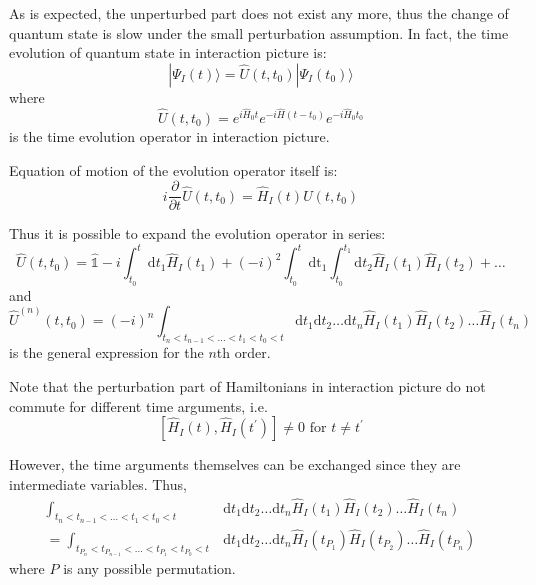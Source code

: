 As is expected, the unperturbed part does not exist any more, thus the change of quantum state is slow under the small perturbation assumption.
In fact, the time evolution of quantum state in interaction picture is:
\begin{equation}
| \Psi_{I}(t) \rangle=\hat{U}\left(t, t_{0}\right) | \Psi_{I}\left(t_{0}\right) \rangle
\end{equation}
where
\begin{equation}
\hat{U}\left(t, t_{0}\right)=e^{i \hat{H}_{0} t} e^{-i \hat{H}\left(t-t_{0}\right)} e^{-i \hat{H}_{0} t_{0}}
\end{equation}
is the time evolution operator in interaction picture.

Equation of motion of the evolution operator itself is:
\begin{equation}
i \frac{\partial}{\partial t} \hat{U}\left(t, t_{0}\right)=\hat{H}_{I}(t) U\left(t, t_{0}\right)
\end{equation}

Thus it is possible to expand the evolution operator in series:
\begin{equation}
\hat{U}\left(t, t_{0}\right)=\hat{\mathbb{1}}-i \int_{t_{0}}^{t} \mathrm{d} t_{1} \hat{H}_{I}\left(t_{1}\right)+(-i)^{2} \int_{t_{0}}^{t} \mathrm{dt}_{1} \int_{t_{0}}^{t_{1}} \mathrm{d} t_{2} \hat{H}_{I}\left(t_{1}\right) \hat{H}_{I}\left(t_{2}\right)+\ldots
\end{equation}
and
\begin{equation}
\hat{U}^{(n)}\left(t, t_{0}\right)=
(-i)^{n} \int_{t_n<t_{n-1}<\dots<t_1<t_0<t} \mathrm{d} t_{1} \mathrm{d} t_{2} \ldots \mathrm{d} t_{n} \hat{H}_{I}\left(t_{1}\right) \hat{H}_{I}\left(t_{2}\right) \ldots \hat{H}_{I}\left(t_{n}\right)
\end{equation}
is the general expression for the $n$th order.

Note that the perturbation part of Hamiltonians in interaction picture do not commute for different time arguments, i.e.
\begin{equation}
\left[\hat{H}_{I}(t), \hat{H}_{I}\left(t^{\prime}\right)\right] \neq 0 \text { for } t \neq t^{\prime}
\end{equation}

However, the time arguments themselves can be exchanged since they are intermediate variables.
Thus,
\begin{equation}
\begin{aligned}
	\int_{t_n<t_{n-1}<\dots<t_1<t_0<t} &\mathrm{d} t_{1} \mathrm{d} t_{2} \ldots \mathrm{d} t_{n} \hat{H}_{I}\left(t_{1}\right) \hat{H}_{I}\left(t_{2}\right) \ldots \hat{H}_{I}\left(t_{n}\right)
	\\
	=\int_{t_{P_n}<t_{P_{n-1}}<\dots<t_{P_1}<t_{P_0}<t} &\mathrm{d} t_{1} \mathrm{d} t_{2} \ldots \mathrm{d} t_{n} \hat{H}_{I}\left(t_{P_1}\right) \hat{H}_{I}\left(t_{P_2}\right) \ldots \hat{H}_{I}\left(t_{P_n}\right)
\end{aligned}
\end{equation}
where $P$ is any possible permutation.

